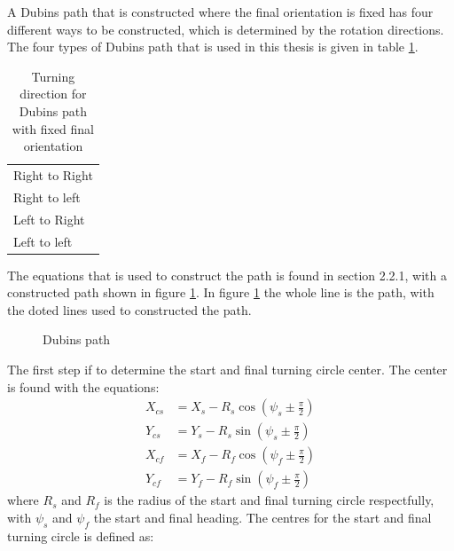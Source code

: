 A Dubins path that is constructed where the final orientation is fixed has four different ways to be constructed, which is determined by the rotation directions. The four types of Dubins path that is used in this thesis is given in table \ref{Tb:DubinsTurningDirection}.
\begin{table}[H]
\centering
\begin{adjustbox}{max width=\textwidth}
\begin{tabular}{ | l |}
\hline
Right to Right \\
Right to left \\
Left to Right \\
Left to left \\ \hline
\end{tabular}
\end{adjustbox}
\caption{Turning direction for Dubins path with fixed final orientation}
\label{Tb:DubinsTurningDirection}
\end{table}
The equations that is used to construct the path is found in \citep{tsourdos2010cooperative} section 2.2.1, with a constructed path shown in figure \ref{Fig:DubinsPath}. In figure \ref{Fig:DubinsPath} the whole line is the path, with the doted lines used to constructed the path.
\begin{figure}[H]
\def\svgwidth{\textwidth} %

\caption{Dubins path}
\label{Fig:DubinsPath}
\end{figure}
The first step if to determine the start and final turning circle center. The center is found with the equations:
\begin{subequations}
\begin{align}
X_{cs} &= X_s - R_s\cos(\psi_s \pm \frac{\pi}{2}) \\
Y_{cs} &= Y_s - R_s\sin(\psi_s \pm \frac{\pi}{2}) \\
X_{cf} &= X_f - R_f\cos(\psi_f \pm \frac{\pi}{2}) \\
Y_{cf} &= Y_f - R_f\sin(\psi_f \pm \frac{\pi}{2})
\end{align}
\end{subequations}
where $R_s$ and $R_f$ is the radius of the start and final turning circle respectfully, with $\psi_s$ and $\psi_f$ the start and final heading. The centres for the start and final turning circle is defined as:


